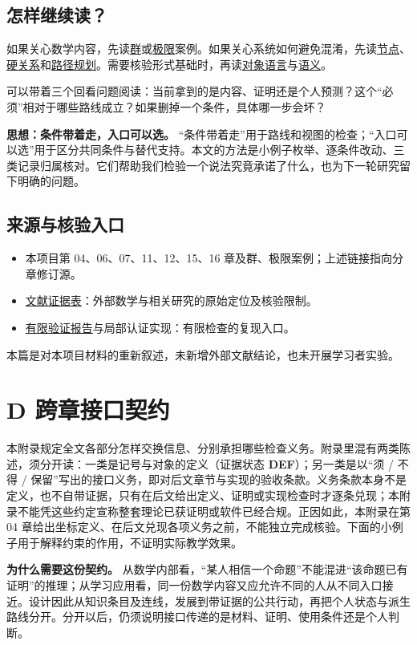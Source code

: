 \documentclass[UTF8,a4paper,zihao=-4,fontset=windows,openany]{ctexbook}
\newcommand{\mcsorigin}[1]{\par\noindent{\small\color{black!55}#1}\par\addvspace{0.8em}}
\begin{document}
\section{怎样继续读？}
如果关心数学内容，先读\hyperref[mcs-source-19]{群}或\hyperref[mcs-source-16]{极限}案例。如果关心系统如何避免混淆，先读\hyperref[mcs-source-6]{节点}、\hyperref[mcs-source-8]{硬关系}和\hyperref[mcs-source-14]{路径规划}。需要核验形式基础时，再读\hyperref[mcs-source-4]{对象语言}与\hyperref[mcs-source-5]{语义}。

可以带着三个回看问题阅读：当前拿到的是内容、证明还是个人预测？这个“必须”相对于哪些路线成立？如果删掉一个条件，具体哪一步会坏？

\textbf{思想：条件带着走，入口可以选。} “条件带着走”用于路线和视图的检查；“入口可以选”用于区分共同条件与替代支持。本文的方法是小例子枚举、逐条件改动、三类记录归属核对。它们帮助我们检验一个说法究竟承诺了什么，也为下一轮研究留下明确的问题。

\section{来源与核验入口}
\begin{itemize}
\item 本项目第 04、06、07、11、12、15、16 章及群、极限案例；上述链接指向分章修订源。
\item \hyperref[mcs-source-25]{文献证据表}：外部数学与相关研究的原始定位及核验限制。
\item \hyperref[mcs-source-27]{有限验证报告}与局部认证实现：有限检查的复现入口。
\end{itemize}
本篇是对本项目材料的重新叙述，未新增外部文献结论，也未开展学习者实验。

\clearpage\chapter{D 跨章接口契约}
\label{mcs-source-2}
\mcsorigin{原章节：D-接口契约.md}
本附录规定全文各部分怎样交换信息、分别承担哪些检查义务。附录里混有两类陈述，须分开读：一类是记号与对象的定义（证据状态 \textbf{DEF}）；另一类是以“须 / 不得 / 保留”写出的接口义务，即对后文章节与实现的验收条款。义务条款本身不是定义，也不自带证据，只有在后文给出定义、证明或实现检查时才逐条兑现；本附录不能凭这些约定宣称整套理论已获证明或软件已经合规。正因如此，本附录在第 04 章给出坐标定义、在后文兑现各项义务之前，不能独立完成核验。下面的小例子用于解释约束的作用，不证明实际教学效果。

\textbf{为什么需要这份契约。} 从数学内部看，“某人相信一个命题”不能混进“该命题已有证明”的推理；从学习应用看，同一份数学内容又应允许不同的人从不同入口接近。设计因此从知识条目及连线，发展到带证据的公共行动，再把个人状态与派生路线分开。分开以后，仍须说明接口传递的是材料、证明、使用条件还是个人判断。
\end{document}
